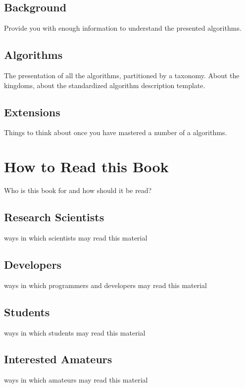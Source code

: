 \subsection{Background}
Provide you with enough information to understand the presented algorithms.

\subsection{Algorithms}
The presentation of all the algorithms, partitioned by a taxonomy. 
About the kingdoms, about the standardized algorithm description template.

\subsection{Extensions}
Things to think about once you have mastered a number of a algorithms.


% 
% 
\section{How to Read this Book}
\label{intro:sec:how_to_read}
Who is this book for and how should it be read?

\subsection{Research Scientists}
ways in which scientists may read this material

\subsection{Developers}
ways in which programmers and developers may read this material

\subsection{Students}
ways in which students may read this material

\subsection{Interested Amateurs}
ways in which amateurs may read this material

